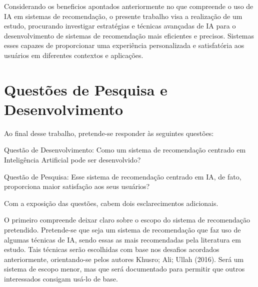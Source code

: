 Considerando os beneficios apontados anteriormente no que compreende o uso de IA em sistemas de recomendação, o presente trabalho 
visa a realização de um estudo, procurando investigar estratégias e técnicas avançadas de IA para o desenvolvimento
de sistemas de recomendação mais eficientes e precisos. Sistemas esses capazes de proporcionar uma experiência 
personalizada e satisfatória aos usuários em diferentes contextos e aplicações.

\section{Questões de Pesquisa e Desenvolvimento}\label{sec:questaopesquisa}
Ao final desse trabalho, pretende-se responder às seguintes questões:

Questão de Desenvolvimento: Como um sistema de recomendação centrado em Inteligência Artificial pode ser desenvolvido? 

Questão de Pesquisa: Esse sistema de recomendação centrado em IA, de fato, proporciona maior satisfação aos seus usuários?

Com a exposição das questões, cabem dois esclarecimentos adicionais.

O primeiro compreende deixar claro sobre o escopo do sistema de recomendação pretendido. Pretende-se que seja um sistema 
de recomendação que faz uso de algumas técnicas de IA, sendo essas as mais recomendadas pela literatura em estudo. 
Tais técnicas serão escolhidas com base nos desafios acordados anteriormente, orientando-se pelos autores 
Khusro; Ali; Ullah (2016). Será um sistema de escopo menor, mas que será documentado para permitir que outros interessados 
consigam usá-lo de base.

